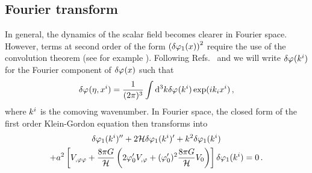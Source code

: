 \subsection{Fourier transform}
\label{sec:fourier-perts}
% 
In general, the dynamics of the scalar field becomes clearer in Fourier space.
However, terms at second order of the form
$\left(\delta\varphi_{1}(x)\right)^2$ require the use
of the convolution theorem (see for example ).
Following Refs.~\cite{book:liddle} and \cite{Malik:2006ir} we will write
$\delta\varphi_{}(k^i)$
for the Fourier component of $\delta\varphi_{}(x)$ such that
% 
\begin{equation}
 \delta\varphi_{}(\eta, x^i) = \frac{1}{(2 \pi)^3} \int \mathrm{d}^3k \delta\varphi_{}(k^i) \exp (i k_i
x^i)
\,,
\end{equation}
% 
where $k^i$ is the comoving wavenumber.
In Fourier space, the closed form of the first order Klein-Gordon equation then
transforms into
%
\begin{multline}
\label{eq:fokg}
 \delta\varphi_{1}(k^i)'' + 2\mathcal{H} \delta\varphi_{1}(k^i)' + k^2\delta\varphi_{1}(k^i) \\
+ a^2 \left[V_{,\varphi\varphi} +
\frac{8\pi G}{\mathcal{H}}\left(2\varphi_{0}' V_{,\varphi} + (\varphi_{0}')^2\frac{8\pi G
}{\mathcal{H}}V_{0}\right)\right]\delta\varphi_{1}(k^i) = 0 \,.
\end{multline}
%


